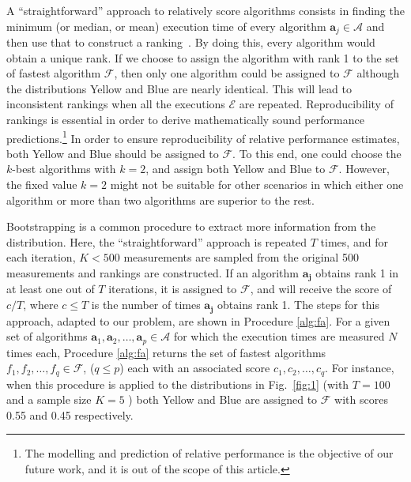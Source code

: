 \documentclass[conference]{IEEEtran}
\begin{document}
A ``straightforward'' approach to relatively score algorithms consists in finding the minimum (or median, or mean) execution time of every algorithm $\mathbf{a}_j \in \mathcal{A}$ and then use that to construct a ranking~\cite{peise2012performance}. By doing this, every algorithm
  would obtain a unique rank. If we choose to assign the algorithm with rank 1 to the set of fastest algorithm
  $\mathcal{F}$, then only one algorithm could be assigned to $\mathcal{F}$ although the distributions Yellow and
  Blue are nearly identical. This will lead to inconsistent rankings when all the executions $\mathcal{E}$ are
  repeated. Reproducibility of rankings is essential in order to derive mathematically sound performance
  predictions.\footnote{The modelling and prediction of relative performance is the objective of our future work, and it is out of the scope of this article.}  In order to ensure reproducibility of relative performance estimates, both Yellow and Blue should be assigned to $\mathcal{F}$. 
  To this end, one could choose the $k$-best algorithms\cite{kbest-kadioglu2011algorithm} with $k=2$, and  assign both
  Yellow and Blue to $\mathcal{F}$. However, the fixed value $k=2$  might not be
  suitable for other scenarios in which either one algorithm or more than two algorithms are superior to the rest. 


 Bootstrapping\cite{bootstrap} is a common procedure to extract more information from the distribution. Here, the ``straightforward'' approach is repeated $T$ times, and for each iteration, $K < 500$ measurements are sampled from the original 500 measurements and rankings are constructed. If an algorithm $\mathbf{a_j}$ obtains rank 1 in at least one out of $T$ iterations, it is assigned to $\mathcal{F}$, and will
 receive the score of  $c/T$, where $c \le T$ is the number of times $\mathbf{a_j}$ obtains rank 1. The steps for
 this approach, adapted to our problem, are shown in Procedure \ref{alg:fa}. For a given set of algorithms $
 \mathbf{a}_1,\mathbf{a}_2 ,\dots, \mathbf{a}_p\in \mathcal{A}$ for which the execution times are measured $N$ times each,
 Procedure \ref{alg:fa} returns the set of fastest algorithms $f_1, f_2, \dots, f_q \in  \mathcal{F}$, ($q \le p$) each with an associated score $c_1,c_2,\dots,c_q$.
 For instance, when this procedure is applied to the distributions in Fig.~\ref{fig:1} (with $T=100$ and a sample size $K=5$ ) both Yellow and Blue are assigned to $\mathcal{F}$ with scores 0.55 and 0.45 respectively. 
\end{document}
